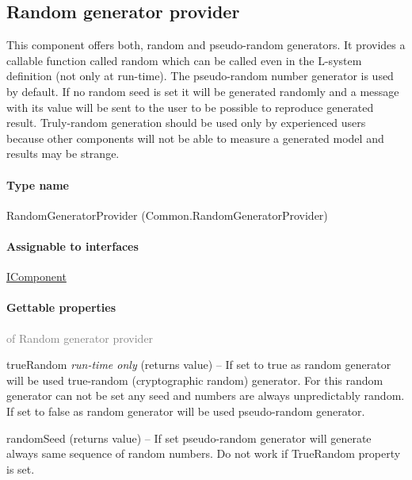 \subsection{Random generator provider}
\label{Malsys.Processing.Components.Common.RandomGeneratorProvider}
This component offers both, random and pseudo-random generators.
            It provides a callable function called random which can be called even in the L-system definition
            (not only at run-time).
            The pseudo-random number generator is used by default.
            If no random seed is set it will be generated randomly and a message with its value will be sent to the user
            to be possible to reproduce generated result.
            Truly-random generation should be used only by experienced users because other components will not be able to
            measure a generated model and results may be strange.\paragraph{Type name}
RandomGeneratorProvider (Common.RandomGeneratorProvider) 	\paragraph{Assignable to interfaces}
		\hyperref[Malsys.Processing.Components.IComponent]{IComponent}%
	\paragraph{Gettable properties}\textcolor{gray}{of Random generator provider}
	\begin{description*}
		\item[trueRandom]
 \textit{run-time only} 		(returns value)
			-- If set to true as random generator will be used
            true-random (cryptographic random) generator.
            For this random generator can not be set any seed and numbers are
            always unpredictably random.
            If set to false as random generator will be used pseudo-random generator.
		\item[randomSeed]
		(returns value)
			-- If set pseudo-random generator will generate always same sequence of random numbers.
            Do not work if TrueRandom property is set.
	\end{description*}
